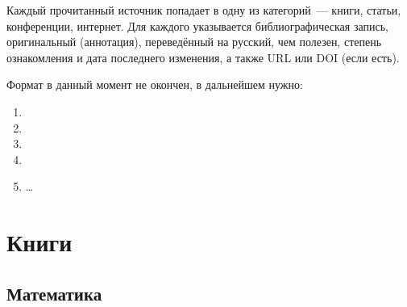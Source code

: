 \documentclass[a4paper, 12pt, titlepage]{extarticle}
\author{\theauthor,\\ кафедра физики и информационных систем КубГУ,\\ направление аспирантуры 01.04.10}
\title{\thetitle}
\date{\today{} \currenttime}
\begin{document}

  \maketitle


    \clearpage
    \tableofcontents


  \label{sec:intro}

  Каждый прочитанный источник попадает в одну из категорий~--- книги, статьи, конференции, интернет.
  Для каждого указывается библиографическая запись, оригинальный  (аннотация),
  переведённый на русский, чем полезен, степень ознакомления и дата последнего изменения, а также
  URL или DOI (если есть).

  Формат в данный момент не окончен, в дальнейшем нужно:
  \begin{enumerate}
    \item {}
    \item {}
    \item {}
    \item {}
    \item \dots
  \end{enumerate}

  \section{Книги}

  \subsection{Математика}
\end{document}
